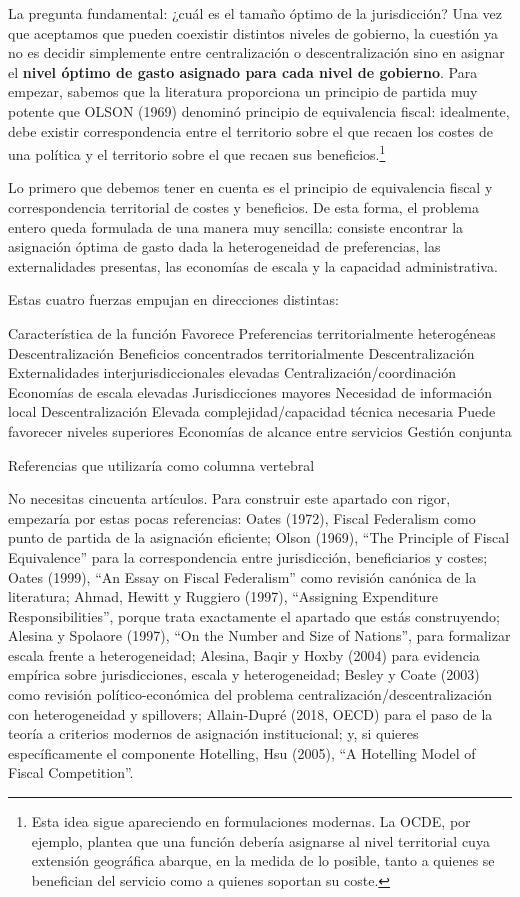 \documentclass[10pt,a4paper]{article}
\begin{document}
La pregunta fundamental: ¿cuál es el tamaño óptimo de la jurisdicción? Una vez que aceptamos que pueden coexistir distintos niveles de gobierno, la cuestión ya no es decidir simplemente entre centralización o descentralización sino en asignar el \textbf{nivel óptimo de gasto asignado para cada nivel de gobierno}. Para empezar, sabemos que la literatura proporciona un principio de partida muy potente que OLSON (1969) denominó principio de equivalencia fiscal: idealmente, debe existir correspondencia entre el territorio sobre el que recaen los costes de una política y el territorio sobre el que recaen sus beneficios.\footnote{%
    Esta idea sigue apareciendo en formulaciones modernas. La OCDE, por ejemplo, plantea que una función debería asignarse al nivel territorial cuya extensión geográfica abarque, en la medida de lo posible, tanto a quienes se benefician del servicio como a quienes soportan su coste.
}

Lo primero que debemos tener en cuenta es el principio de equivalencia fiscal y correspondencia territorial de costes y beneficios. De esta forma, el problema entero queda formulada de una manera muy sencilla: consiste encontrar la asignación óptima de gasto dada la heterogeneidad de preferencias, las externalidades presentas, las economías de escala y la capacidad administrativa.

Estas cuatro fuerzas empujan en direcciones distintas:

Característica de la función	Favorece
Preferencias territorialmente heterogéneas	Descentralización
Beneficios concentrados territorialmente	Descentralización
Externalidades interjurisdiccionales elevadas	Centralización/coordinación
Economías de escala elevadas	Jurisdicciones mayores
Necesidad de información local	Descentralización
Elevada complejidad/capacidad técnica necesaria	Puede favorecer niveles superiores
Economías de alcance entre servicios	Gestión conjunta


Referencias que utilizaría como columna vertebral

No necesitas cincuenta artículos. Para construir este apartado con rigor, empezaría por estas pocas referencias: Oates (1972), Fiscal Federalism como punto de partida de la asignación eficiente; Olson (1969), “The Principle of Fiscal Equivalence” para la correspondencia entre jurisdicción, beneficiarios y costes; Oates (1999), “An Essay on Fiscal Federalism” como revisión canónica de la literatura; Ahmad, Hewitt y Ruggiero (1997), “Assigning Expenditure Responsibilities”, porque trata exactamente el apartado que estás construyendo; Alesina y Spolaore (1997), “On the Number and Size of Nations”, para formalizar escala frente a heterogeneidad; Alesina, Baqir y Hoxby (2004) para evidencia empírica sobre jurisdicciones, escala y heterogeneidad; Besley y Coate (2003) como revisión político-económica del problema centralización/descentralización con heterogeneidad y spillovers; Allain-Dupré (2018, OECD) para el paso de la teoría a criterios modernos de asignación institucional; y, si quieres específicamente el componente Hotelling, Hsu (2005), “A Hotelling Model of Fiscal Competition”.  
\end{document}
